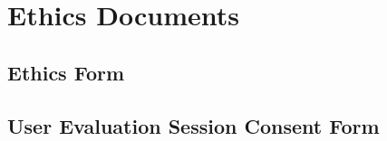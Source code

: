 \chapter{Ethics Documents}

\label{AppendixEthics}

\section{Ethics Form}


\section{User Evaluation Session Consent Form}

